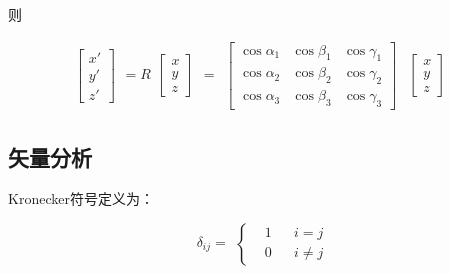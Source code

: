 则

\begin{equation*}
  \begin{aligned}
    \left[
      \begin{array}{ccc}
        x'\\
        y'\\
        z' 
      \end{array}
    \right ]
  \end{aligned}
  = R
  \begin{aligned}
    \left[
      \begin{array}{ccc}
        x\\
        y\\
        z 
      \end{array}
    \right ]
  \end{aligned}
  = 
  \begin{aligned}
    \left[
      \begin{array}{ccc}
       \cos \alpha_{1} & \cos \beta_{1} & \cos \gamma_{1}\\
       \cos \alpha_{2} & \cos \beta_{2} & \cos \gamma_{2}\\
       \cos \alpha_{3} & \cos \beta_{3} & \cos \gamma_{3}
      \end{array}
    \right ]
  \end{aligned}
  \begin{aligned}
    \left[
      \begin{array}{ccc}
        x\\
        y\\
        z 
      \end{array}
    \right ]
  \end{aligned}
\end{equation*}

\subsection{矢量分析}

Kronecker符号定义为：

\begin{equation*}
  \begin{aligned}
    \delta_{ij} =
  \end{aligned}
  \left\{
  \begin{aligned}
    & 1 && i=j \\
    & 0 && i\neq j
  \end{aligned}
  \right.
\end{equation*}

